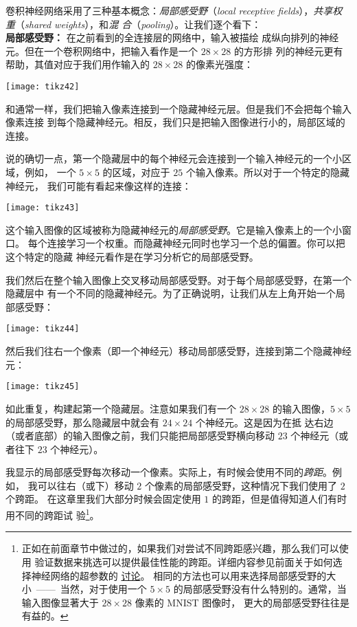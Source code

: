 卷积神经网络采用了三种基本概念：\emph{局部感受野}（\emph{local receptive
    fields}），\emph{共享权重}（\emph{shared
    weights}），和\emph{混
  合}（\emph{pooling}）。让我们逐个看下：\\

\textbf{局部感受野：} 在之前看到的全连接层的网络中，输入被描绘
成纵向排列的神经元。但在一个卷积网络中，把输入看作是一个 $28 \times 28$ 的方形排
列的神经元更有帮助，其值对应于我们用作输入的 $28 \times 28$ 的像素光强度：
\begin{center}
  \texttt{[image: tikz42]}
\end{center}

和通常一样，我们把输入像素连接到一个隐藏神经元层。但是我们不会把每个输入像素连接
到每个隐藏神经元。相反，我们只是把输入图像进行小的，局部区域的连接。

说的确切一点，第一个隐藏层中的每个神经元会连接到一个输入神经元的一个小区域，例如，
一个 $5 \times 5$ 的区域，对应于 $25$ 个输入像素。所以对于一个特定的隐藏神经元，
我们可能有看起来像这样的连接：
\begin{center}
  \texttt{[image: tikz43]}
\end{center}

这个输入图像的区域被称为隐藏神经元的\emph{局部感受野}。它是输入像素上的一个小窗口。
每个连接学习一个权重。而隐藏神经元同时也学习一个总的偏置。你可以把这个特定的隐藏
神经元看作是在学习分析它的局部感受野。

我们然后在整个输入图像上交叉移动局部感受野。对于每个局部感受野，在第一个隐藏层中
有一个不同的隐藏神经元。为了正确说明，让我们从左上角开始一个局部感受野：
\begin{center}
  \texttt{[image: tikz44]}
\end{center}

然后我们往右一个像素（即一个神经元）移动局部感受野，连接到第二个隐藏神经元：
\begin{center}
  \texttt{[image: tikz45]}
\end{center}

如此重复，构建起第一个隐藏层。注意如果我们有一个 $28 \times 28$ 的输入图像，$5
\times 5$ 的局部感受野，那么隐藏层中就会有 $24 \times 24$ 个神经元。这是因为在抵
达右边（或者底部）的输入图像之前，我们只能把局部感受野横向移动 $23$ 个神经元（或
  者往下 $23$ 个神经元）。

我显示的局部感受野每次移动一个像素。实际上，有时候会使用不同的\emph{跨距}。例如，
我可以往右（或下）移动 $2$ 个像素的局部感受野，这种情况下我们使用了 $2$ 个跨距。
在这章里我们大部分时候会固定使用 $1$ 的跨距，但是值得知道人们有时用不同的跨距试
验\footnote{正如在前面章节中做过的，如果我们对尝试不同跨距感兴趣，那么我们可以使用
验证数据来挑选可以提供最佳性能的跨距。详细内容参见前面关于如何选择神经网络的超参数的%
\hyperref[sec:how_to_choose_a_neural_network's_hyper-parameters]{讨论}。
相同的方法也可以用来选择局部感受野的大小~——~当然，对于使用一个 $5 \times 5$
的局部感受野没有什么特别的。通常，当输入图像显著大于 $28 \times 28$ 像素的 MNIST 图像时，
更大的局部感受野往往是有益的。}。\\


